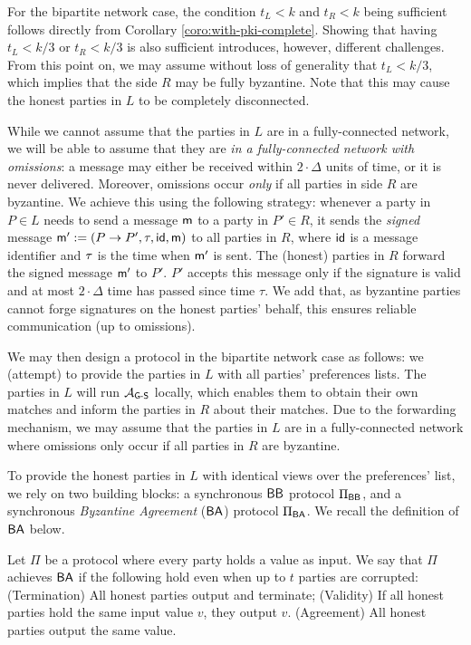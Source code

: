 For the bipartite network case, the condition $t_L < k$ and $t_R < k$ being sufficient follows directly from Corollary \ref{coro:with-pki-complete}. Showing that having $t_L < k/3$ or $t_R < k/3$ is also sufficient introduces, however, different challenges. From this point on, we may assume without loss of generality that $t_L < k / 3$, which implies that the side $R$ may be fully byzantine. Note that this may cause the honest parties in $L$ to be completely disconnected.

While we cannot assume that the parties in $L$ are in a fully-connected network, we will be able to assume that they are \emph{in a fully-connected network with omissions}: a message may either be received within $2 \cdot \Delta$ units of time, or it is never delivered. Moreover, omissions occur \emph{only} if all parties in side $R$ are byzantine. We achieve this using the following strategy: whenever a party in $P \in L$ needs to send a message $\textsf{m}$ to a party in $P' \in R$, it sends the \emph{signed} message $\textsf{m}' := (P \rightarrow P', \tau, \textsf{id}, \textsf{m})$ to all parties in $R$, where $\textsf{id}$ is a message identifier and $\tau$ is the time when $\textsf{m}'$ is sent. The (honest) parties in $R$ forward the signed message $\textsf{m}'$ to $P'$. $P'$ accepts this message only if the signature is valid and at most $2 \cdot \Delta$ time has passed since time $\tau$. We add that, as byzantine parties cannot forge signatures on the honest parties' behalf, this ensures reliable communication (up to omissions).

We may then design a protocol in the bipartite network case as follows: we (attempt) to provide the parties in $L$ with all parties' preferences lists. The parties in $L$ will run $\mathcal{A}_\textsf{G-S}$ locally, which enables them to obtain their own matches and inform the parties in $R$ about their matches. Due to the forwarding mechanism, we may assume that the parties in $L$ are in a fully-connected network where omissions only occur if all parties in $R$ are byzantine.

To provide the honest parties in $L$ with identical views over the preferences' list, we rely on two building blocks: a synchronous $\textsf{BB}$ protocol $\Pi_{\textsf{BB}}$, and a synchronous \emph{Byzantine Agreement} ($\textsf{BA}$) protocol $\Pi_{\textsf{BA}}$. We recall the definition of $\textsf{BA}$ below. 
\begin{definition}\label{def:ba}
	Let $\Pi$ be a protocol where every party holds a value as input. 
    We say that $\Pi$ achieves $\textsf{BA}$ if the following  hold even when up to $t$ parties are corrupted:
    (Termination) All honest parties output and terminate;
    (Validity) If all honest parties hold the same input value $v$, they output $v$.
    (Agreement) All honest parties output the same value.
\end{definition}

